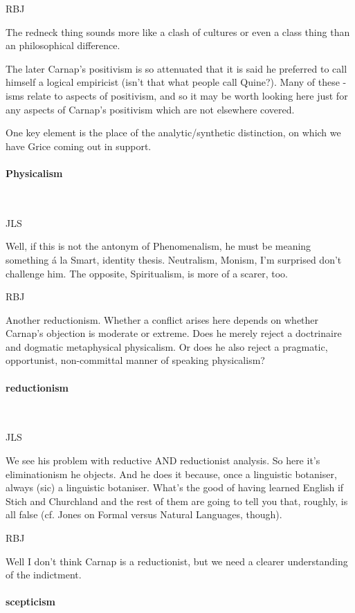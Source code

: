 \documentclass[10pt,titlepage]{book}
\begin{document}
RBJ

The redneck thing sounds more like a clash of cultures or even a class thing than an philosophical difference.

The later Carnap's positivism is so attenuated that it is said he preferred to call himself a logical empiricist (isn't that what people call Quine?).
Many of these -isms relate to aspects of positivism, and so it may be worth looking here just for any aspects of Carnap's positivism which are not elsewhere covered.

One key element is the place of the analytic/synthetic distinction, on which we have Grice coming out in support.
 
\paragraph{Physicalism}\ 

JLS

Well, if this is not the antonym of Phenomenalism, he must be  
meaning something \'a la Smart, identity thesis. Neutralism, Monism, I'm 
surprised  don't challenge him. The opposite, Spiritualism, is more of a scarer, 
too.

RBJ

Another reductionism.
Whether a conflict arises here depends on whether Carnap's objection is moderate or extreme.
Does he merely reject a doctrinaire and dogmatic metaphysical physicalism.
Or does he also reject a pragmatic, opportunist, non-committal manner of speaking physicalism?

\paragraph{reductionism}\ 

JLS

We see his problem with reductive AND reductionist analysis.  
So here it's eliminationism he objects. And he does it because, once a  
linguistic botaniser, always (sic) a linguistic botaniser. What's the good of  
having learned English if Stich and Churchland and the rest of them are 
going to  tell you that, roughly, is all false (cf. Jones on Formal versus 
Natural  Languages, though).

RBJ

Well I don't think Carnap is a reductionist, but we need a clearer understanding of the indictment.

\paragraph{scepticism}\ 
\end{document}
